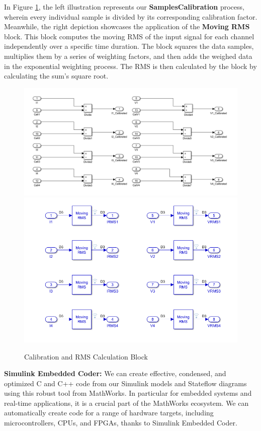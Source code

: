 In Figure \ref{fig:x Cal_RMS Block }, the left illustration represents our \textbf{SamplesCalibration} process, wherein every individual sample is divided by its corresponding calibration factor. Meanwhile, the right depiction showcases the application of the \textbf{Moving RMS} block. This block computes the moving RMS of the input signal for each channel independently over a specific time duration. The block squares the data samples, multiplies them by a series of weighting factors, and then adds the weighed data in the exponential weighting process. The RMS is then calculated by the block by calculating the sum's square root.\par

\begin{figure}[htbp]
\centering
\includegraphics[scale=0.4]{images/Sample_Calibration.PNG}
\includegraphics[scale=0.4]{images/RMS.png}
\caption{Calibration and RMS Calculation Block}
\label{fig:x Cal_RMS Block }
\end{figure}

\textbf{Simulink Embedded Coder:}
We can create effective, condensed, and optimized C and C++ code from our Simulink models and Stateflow diagrams using this robust tool from MathWorks. In particular for embedded systems and real-time applications, it is a crucial part of the MathWorks ecosystem. We can automatically create code for a range of hardware targets, including microcontrollers, CPUs, and FPGAs, thanks to Simulink Embedded Coder.


